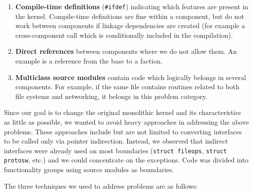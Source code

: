 \begin{enumerate}
\item   \textbf{Compile-time definitions} (\texttt{\#ifdef}) indicating
	which features are present in the kernel.  Compile-time
	definitions are fine within a component, but do not work
	between components if linkage dependencies are created
	(for example a cross-component call which is conditionally
	included in the compilation).

\item   \textbf{Direct references} between components where we do
	not allow them.  An example is a reference from the base
	to a faction.

\item   \textbf{Multiclass source modules} contain code which
	logically belongs in several components.  For example, if
	the same file contains routines related to both file systems
	and networking, it belongs in this problem category.
\end{enumerate}

Since our goal is to change the original monolithic kernel and its
characteristics as little as possible, we wanted to avoid heavy
approaches in addressing the above problems.  These approaches
include but are not limited to converting interfaces to be called only
via pointer indirection.  Instead, we observed that indirect
interfaces were already used on most boundaries (\eg \texttt{struct
fileops}, \texttt{struct protosw}, etc.) and we could concentrate
on the exceptions.  Code was divided into functionality groups
using source modules as boundaries.

The three techniques we used to address problems are as follows:

